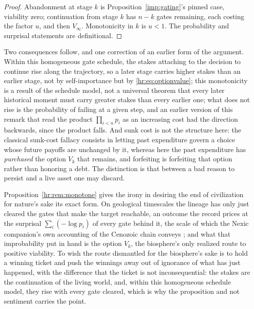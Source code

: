 \begin{proof}
Abandonment at stage $k$ is Proposition~\ref{imp:gating}'s pinned
case, viability zero; continuation from stage $k$ has $n-k$ gates
remaining, each costing the factor $u$, and then $V_\infty$. Monotonicity
in $k$ is $u<1$. The probability and surprisal statements are
definitional.
\end{proof}

\noindent Two consequences follow, and one correction of an earlier
form of the argument. Within this homogeneous gate schedule, the stakes attaching to the
decision to continue rise along the trajectory, so a later stage carries
higher stakes than an earlier stage, not by self-importance but by
\eqref{hr:eq:optionvalue}; this monotonicity is a result of the schedule
model, not a universal theorem that every later historical moment must
carry greater stakes than every earlier one;
what does not rise is the probability of failing at a given step, and an
earlier version of this remark that read the product $\prod_{i<n}p_i$
as an increasing cost had the direction backwards, since the product
falls. And sunk cost is not the structure here: the classical sunk-cost
fallacy consists in letting past expenditure govern a choice whose
future payoffs are unchanged by it, whereas here the past expenditure
has \emph{purchased} the option $V_k$ that remains, and forfeiting is
forfeiting that option rather than honoring a debt. The distinction is
that between a bad reason to persist and a live asset one may discard.

\begin{remark}\label{hr:rem:winnersirony}
Proposition~\ref{hr:rem:monotone} gives the irony in desiring the end
of civilization for nature's sake its exact form. On geological
timescales the lineage has only just cleared the gates that make the
target reachable, an outcome the record prices at the surprisal
$\sum_i(-\log p_i)$ of every gate behind it, the scale of which the
Nexic companion's own accounting of the Cenozoic chain conveys
\cite{Nexus}; and what that improbability put in hand is the option
$V_k$, the biosphere's only realized route to positive viability.
To wish the route dismantled for the biosphere's sake is to hold a
winning ticket and push the winnings away out of ignorance of what has
just happened, with the difference that the ticket is not
inconsequential: the stakes are the continuation of the living world,
and, within this homogeneous schedule model, they rise with every gate
cleared, which is why the proposition and not sentiment carries the
point.
\end{remark}

